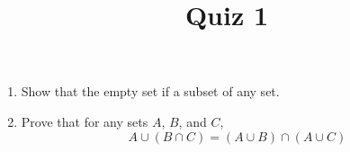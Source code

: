 \documentclass[10pt,a4paper,oneside]{book}
\title{Quiz 1}
\author{}
\date{}
\begin{document}
\maketitle

\begin{enumerate}
    \item Show that the empty set if a subset of any set.
    \item Prove that for any sets $A$, $B$, and $C$,
    \[ A\cup (B\cap C) = (A\cup B)\cap (A\cup C)\]

    
\end{enumerate}
\end{document}
